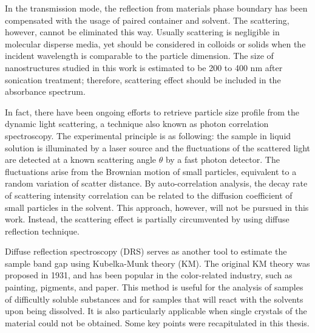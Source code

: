 In the transmission mode, the reflection from materials phase boundary has been compensated with the usage of paired container and solvent. The scattering, however, cannot be eliminated this way. Usually scattering is negligible in molecular disperse media, yet should be considered in colloids or solids when the incident wavelength is comparable to the particle dimension. The size of nanostructures studied in this work is estimated to be 200 to 400 nm after sonication treatment; therefore, scattering effect should be included in the absorbance spectrum. 

In fact, there have been ongoing efforts to retrieve particle size profile from the dynamic light scattering, a technique also known as photon correlation spectroscopy. The experimental principle is as following: the sample in liquid solution is illuminated by a laser source and the fluctuations of the scattered light are detected at a known scattering angle $\theta$ by a fast photon detector. The fluctuations arise from the Brownian motion of small particles, equivalent to a random variation of scatter distance. By auto-correlation analysis, the decay rate of scattering intensity correlation can be related to the diffusion coefficient of small particles in the solvent.\cite{Maret1987} This approach, however, will not be pursued in this work. Instead, the scattering effect is partially circumvented by using diffuse reflection technique. 

Diffuse reflection spectroscopy (DRS) serves as another tool to estimate the sample band gap using Kubelka-Munk theory (KM).\cite{Tandon1970} The original KM theory was proposed in 1931,\cite{Kubelka1931} and has been popular in the color-related industry, such as painting, pigments, and paper. This method is useful for the analysis of samples of difficultly soluble substances and for samples that will react with the solvents upon being dissolved. It is also particularly applicable when single crystals of the material could not be obtained. Some key points were recapitulated in this thesis.

